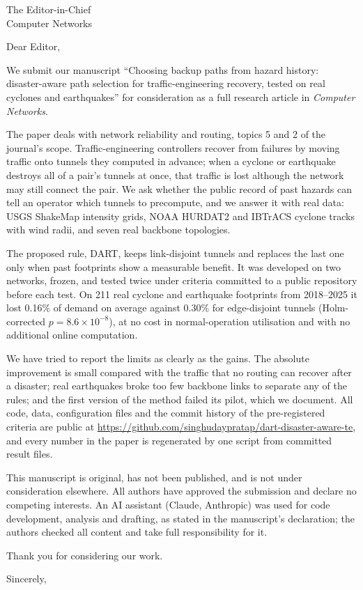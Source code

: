 \documentclass[11pt]{letter}
\begin{document}
\begin{letter}{The Editor-in-Chief\\Computer Networks}
\opening{Dear Editor,}

We submit our manuscript ``Choosing backup paths from hazard history: disaster-aware path selection for traffic-engineering recovery, tested on real cyclones and earthquakes'' for consideration as a full research article in \emph{Computer Networks}.

The paper deals with network reliability and routing, topics 5 and 2 of the journal's scope. Traffic-engineering controllers recover from failures by moving traffic onto tunnels they computed in advance; when a cyclone or earthquake destroys all of a pair's tunnels at once, that traffic is lost although the network may still connect the pair. We ask whether the public record of past hazards can tell an operator which tunnels to precompute, and we answer it with real data: USGS ShakeMap intensity grids, NOAA HURDAT2 and IBTrACS cyclone tracks with wind radii, and seven real backbone topologies.

The proposed rule, DART, keeps link-disjoint tunnels and replaces the last one only when past footprints show a measurable benefit. It was developed on two networks, frozen, and tested twice under criteria committed to a public repository before each test. On 211 real cyclone and earthquake footprints from 2018--2025 it lost 0.16\% of demand on average against 0.30\% for edge-disjoint tunnels (Holm-corrected $p=8.6\times10^{-8}$), at no cost in normal-operation utilisation and with no additional online computation.

We have tried to report the limits as clearly as the gains. The absolute improvement is small compared with the traffic that no routing can recover after a disaster; real earthquakes broke too few backbone links to separate any of the rules; and the first version of the method failed its pilot, which we document. All code, data, configuration files and the commit history of the pre-registered criteria are public at \url{https://github.com/singhudaypratap/dart-disaster-aware-te}, and every number in the paper is regenerated by one script from committed result files.

This manuscript is original, has not been published, and is not under consideration elsewhere. All authors have approved the submission and declare no competing interests. An AI assistant (Claude, Anthropic) was used for code development, analysis and drafting, as stated in the manuscript's declaration; the authors checked all content and take full responsibility for it.

Thank you for considering our work.

\closing{Sincerely,}
\end{letter}
\end{document}
